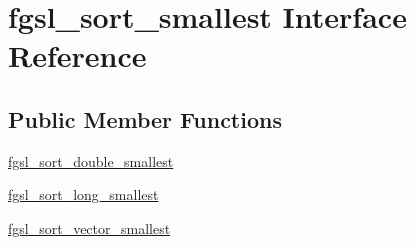 \hypertarget{interfacefgsl__sort__smallest}{\section{fgsl\-\_\-sort\-\_\-smallest Interface Reference}
\label{interfacefgsl__sort__smallest}
}
\subsection*{Public Member Functions}
\begin{DoxyCompactItemize}
\item 
\hyperlink{interfacefgsl__sort__smallest_a1750449525763b921997810a44d099ae}{fgsl\-\_\-sort\-\_\-double\-\_\-smallest}
\item 
\hyperlink{interfacefgsl__sort__smallest_a25a5022777d8408f473cdcce1585d704}{fgsl\-\_\-sort\-\_\-long\-\_\-smallest}
\item 
\hyperlink{interfacefgsl__sort__smallest_a5c4ee27d2b4e278553672206e1cc1314}{fgsl\-\_\-sort\-\_\-vector\-\_\-smallest}
\end{DoxyCompactItemize}


